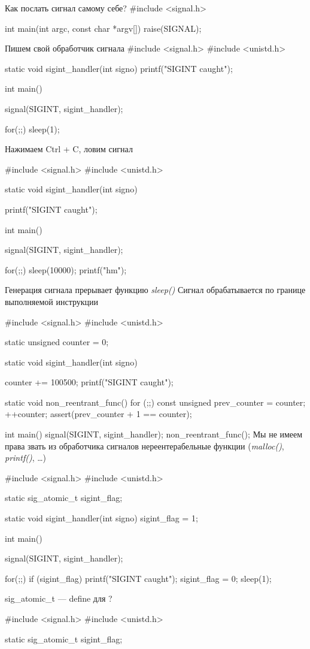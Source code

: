 Как послать сигнал самому себе?
#include <signal.h>

int main(int argc, const char *argv[]) {
    raise(SIGNAL);
}

Пишем свой обработчик сигнала
#include <signal.h>
#include <unistd.h>

static void sigint_handler(int signo) {
    printf("SIGINT caught\n");
}

int main() {
    signal(SIGINT, sigint_handler);

    for(;;) {
        sleep(1);
    }
}
Нажимаем Ctrl + C, ловим сигнал

#include <signal.h>
#include <unistd.h>

static void sigint_handler(int signo) {
    printf("SIGINT caught\n");

}

int main() {
    signal(SIGINT, sigint_handler);

    for(;;) {
        sleep(10000);
        printf("hm\n");
    }
}
Генерация сигнала прерывает функцию \emph{sleep()}
Сигнал обрабатывается по границе выполняемой инструкции

#include <signal.h>
#include <unistd.h>

static unsigned counter = 0;

static void sigint_handler(int signo) {
    counter += 100500;
    printf("SIGINT caught\n");

}

static void non_reentrant_func() {
    for (;;) {
        const unsigned prev_counter = counter;
        ++counter;
        assert(prev_counter + 1 == counter);
    }
}

int main() {
    signal(SIGINT, sigint_handler);
    non_reentrant_func();
}
Мы не имеем права звать из обработчика сигналов нереентерабельные функции (\emph{malloc()}, \emph{printf()}, \dots)

#include <signal.h>
#include <unistd.h>

static sig_atomic_t sigint_flag;

static void sigint_handler(int signo) {
    sigint_flag = 1;
}

int main() {
    signal(SIGINT, sigint_handler);

    for(;;) {
        if (sigint_flag) {
            printf("SIGINT caught\n");
            sigint_flag = 0;
        }
        sleep(1);
    }
}
sig_atomic_t --- define для ?


#include <signal.h>
#include <unistd.h>

static sig_atomic_t sigint_flag;

